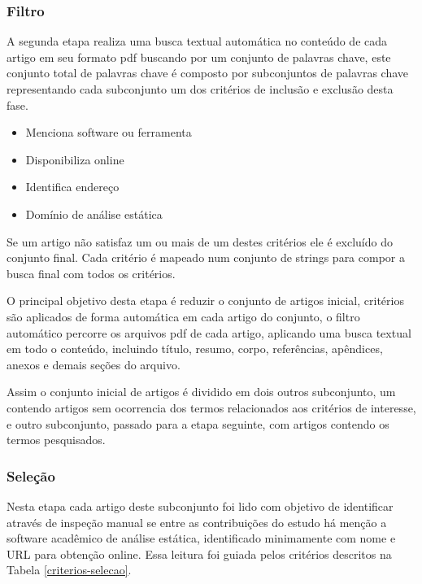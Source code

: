 

\subsubsection{Filtro}

A segunda etapa realiza uma busca textual automática no conteúdo de cada artigo
em seu formato pdf buscando por um conjunto de palavras chave, este conjunto
total de palavras chave é composto por subconjuntos de palavras chave
representando cada subconjunto um dos critérios de inclusão e exclusão desta
fase.

\begin{itemize}
  \item Menciona software ou ferramenta
  \item Disponibiliza online
  \item Identifica endereço
  \item Domínio de análise estática
\end{itemize}

Se um artigo não satisfaz um ou mais de um destes critérios ele é excluído do
conjunto final. Cada critério é mapeado num conjunto de strings para compor a
busca final com todos os critérios.

O principal objetivo desta etapa é reduzir o conjunto de artigos inicial,
critérios são aplicados de forma automática em cada artigo do conjunto, o
filtro automático percorre os arquivos pdf de cada artigo, aplicando uma busca
textual em todo o conteúdo, incluindo título, resumo, corpo, referências,
apêndices, anexos e demais seções do arquivo.

Assim o conjunto inicial de artigos é dividido em dois outros subconjunto, um
contendo artigos sem ocorrencia dos termos relacionados aos critérios de
interesse, e outro subconjunto, passado para a etapa seguinte, com artigos
contendo os termos pesquisados.

\subsubsection{Seleção}

Nesta etapa cada artigo deste subconjunto foi lido com objetivo de identificar
através de inspeção manual se entre as contribuições do estudo há menção a
software acadêmico de análise estática, identificado minimamente com nome e URL
para obtenção online. 
Essa leitura foi guiada pelos critérios descritos na Tabela \ref{criterios-selecao}.

